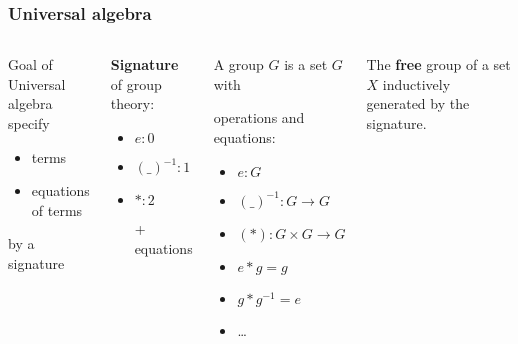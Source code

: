\documentclass[
serif,
mathsans,
]
{beamer}
\begin{document}
\begin{frame}
 \frametitle{Universal algebra}
 
 \begin{columns}
  

  \begin{block}{Goal of Universal algebra}
   specify
   \begin{itemize}
    \item terms
    \item equations of terms
   \end{itemize}
   by a signature
  \end{block}

  \begin{exampleblock}{\textbf{Signature} of group theory:}
     \begin{itemize}
      \item $e : 0$
      \item $(\_)^{-1} : 1$
      \item $ * : 2$
      \item [+] equations
     \end{itemize}
  \end{exampleblock}
  
  
 
 \begin{exampleblock}{A group $G$ is a set $G$ with}
 
    operations and equations:
   \begin{itemize}
    \item $e : G$
    \item $(\_)^{-1} : G \to G$
    \item $(*) : G \times G \to G$
    \item $ e * g = g$
    \item $g * g^{-1} = e$
    \item \ldots
   \end{itemize}

  \end{exampleblock}
  
  \begin{block}{The \textbf{free} group of a set $X$} 
     inductively generated by the signature.
  \end{block}

  
 \end{columns}
 
 
\end{frame}
\end{document}
